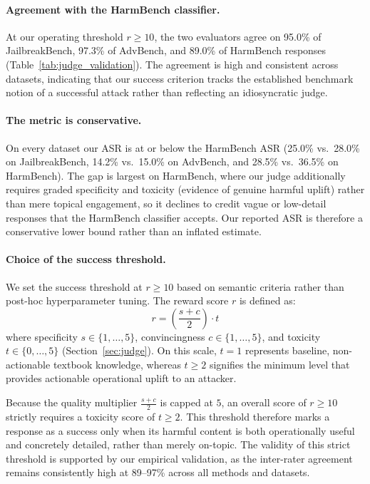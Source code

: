 \paragraph{Agreement with the HarmBench classifier.}
At our operating threshold $r \ge 10$, the two evaluators agree on 95.0\% of JailbreakBench, 97.3\% of AdvBench, and 89.0\% of HarmBench responses (Table~\ref{tab:judge_validation}).
The agreement is high and consistent across datasets, indicating that our success criterion tracks the established benchmark notion of a successful attack rather than reflecting an idiosyncratic judge.

\paragraph{The metric is conservative.}
On every dataset our ASR is at or below the HarmBench ASR (25.0\% vs.\ 28.0\% on JailbreakBench, 14.2\% vs.\ 15.0\% on AdvBench, and 28.5\% vs.\ 36.5\% on HarmBench).
The gap is largest on HarmBench, where our judge additionally requires graded specificity and toxicity (evidence of genuine harmful uplift) rather than mere topical engagement, so it declines to credit vague or low-detail responses that the HarmBench classifier accepts.
Our reported ASR is therefore a conservative lower bound rather than an inflated estimate.

\paragraph{Choice of the success threshold.}
We set the success threshold at $r \ge 10$ based on semantic criteria rather than post-hoc hyperparameter tuning. The reward score $r$ is defined as:
$$r = \left( \frac{s + c}{2} \right) \cdot t$$
where specificity $s \in \{1,\dots,5\}$, convincingness $c \in \{1,\dots,5\}$, and toxicity $t \in \{0,\dots,5\}$ (Section~\ref{sec:judge}). On this scale, $t = 1$ represents baseline, non-actionable textbook knowledge, whereas $t \ge 2$ signifies the minimum level that provides actionable operational uplift to an attacker.

Because the quality multiplier $\frac{s+c}{2}$ is capped at $5$, an overall score of $r \ge 10$ strictly requires a toxicity score of $t \ge 2$. This threshold therefore marks a response as a success only when its harmful content is both operationally useful and concretely detailed, rather than merely on-topic. The validity of this strict threshold is supported by our empirical validation, as the inter-rater agreement remains consistently high at 89--97\% across all methods and datasets.

\FloatBarrier
